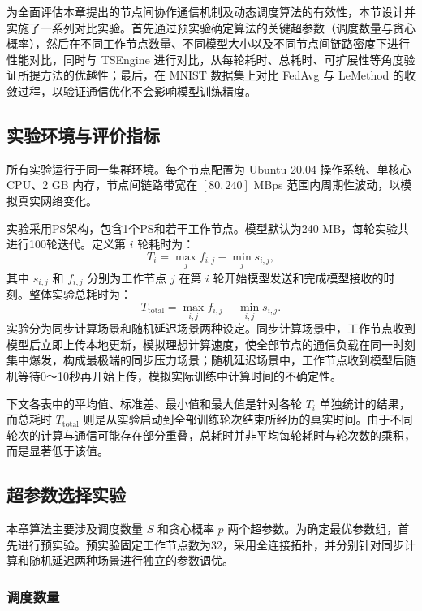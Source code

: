 \documentclass[master, vlined]{DissertUESTC}
\begin{document}
	为全面评估本章提出的节点间协作通信机制及动态调度算法的有效性，本节设计并实施了一系列对比实验。首先通过预实验确定算法的关键超参数（调度数量与贪心概率），然后在不同工作节点数量、不同模型大小以及不同节点间链路密度下进行性能对比，同时与 TSEngine 进行对比，从每轮耗时、总耗时、可扩展性等角度验证所提方法的优越性；最后，在 MNIST 数据集上对比 FedAvg 与 LeMethod 的收敛过程，以验证通信优化不会影响模型训练精度。

	\subsection{实验环境与评价指标}
	\label{sec:exp-setup}

	所有实验运行于同一集群环境。每个节点配置为 Ubuntu 20.04 操作系统、单核心 CPU、2 GB 内存，节点间链路带宽在 $[80, 240]$ MBps 范围内周期性波动，以模拟真实网络变化。

	实验采用PS架构，包含1个PS和若干工作节点。模型默认为240 MB，每轮实验共进行100轮迭代。定义第 $i$ 轮耗时为：
	\begin{equation}
		T_i = \max_{j} f_{i,j} - \min_{j} s_{i,j},
	\end{equation}
	其中 $s_{i,j}$ 和 $f_{i,j}$ 分别为工作节点 $j$ 在第 $i$ 轮开始模型发送和完成模型接收的时刻。整体实验总耗时为：
	\begin{equation}
		T_{\text{total}} = \max_{i,j} f_{i,j} - \min_{i,j} s_{i,j}.
	\end{equation}
	实验分为同步计算场景和随机延迟场景两种设定。同步计算场景中，工作节点收到模型后立即上传本地更新，模拟理想计算速度，使全部节点的通信负载在同一时刻集中爆发，构成最极端的同步压力场景；随机延迟场景中，工作节点收到模型后随机等待0～10秒再开始上传，模拟实际训练中计算时间的不确定性。

	下文各表中的平均值、标准差、最小值和最大值是针对各轮 $T_i$ 单独统计的结果，而总耗时 $T_{\text{total}}$ 则是从实验启动到全部训练轮次结束所经历的真实时间。由于不同轮次的计算与通信可能存在部分重叠，总耗时并非平均每轮耗时与轮次数的乘积，而是显著低于该值。

	\subsection{超参数选择实验}

	本章算法主要涉及调度数量 $S$ 和贪心概率 $p$ 两个超参数。为确定最优参数组，首先进行预实验。预实验固定工作节点数为32，采用全连接拓扑，并分别针对同步计算和随机延迟两种场景进行独立的参数调优。

	\subsubsection{调度数量}
\end{document}
